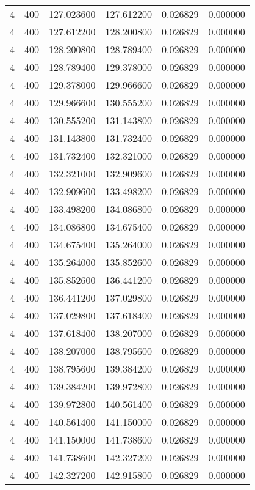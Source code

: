 \begin{longtable}{rrrrrr}
4 & 400 & 127.023600 & 127.612200 & 0.026829 & 0.000000 \\
4 & 400 & 127.612200 & 128.200800 & 0.026829 & 0.000000 \\
4 & 400 & 128.200800 & 128.789400 & 0.026829 & 0.000000 \\
4 & 400 & 128.789400 & 129.378000 & 0.026829 & 0.000000 \\
4 & 400 & 129.378000 & 129.966600 & 0.026829 & 0.000000 \\
4 & 400 & 129.966600 & 130.555200 & 0.026829 & 0.000000 \\
4 & 400 & 130.555200 & 131.143800 & 0.026829 & 0.000000 \\
4 & 400 & 131.143800 & 131.732400 & 0.026829 & 0.000000 \\
4 & 400 & 131.732400 & 132.321000 & 0.026829 & 0.000000 \\
4 & 400 & 132.321000 & 132.909600 & 0.026829 & 0.000000 \\
4 & 400 & 132.909600 & 133.498200 & 0.026829 & 0.000000 \\
4 & 400 & 133.498200 & 134.086800 & 0.026829 & 0.000000 \\
4 & 400 & 134.086800 & 134.675400 & 0.026829 & 0.000000 \\
4 & 400 & 134.675400 & 135.264000 & 0.026829 & 0.000000 \\
4 & 400 & 135.264000 & 135.852600 & 0.026829 & 0.000000 \\
4 & 400 & 135.852600 & 136.441200 & 0.026829 & 0.000000 \\
4 & 400 & 136.441200 & 137.029800 & 0.026829 & 0.000000 \\
4 & 400 & 137.029800 & 137.618400 & 0.026829 & 0.000000 \\
4 & 400 & 137.618400 & 138.207000 & 0.026829 & 0.000000 \\
4 & 400 & 138.207000 & 138.795600 & 0.026829 & 0.000000 \\
4 & 400 & 138.795600 & 139.384200 & 0.026829 & 0.000000 \\
4 & 400 & 139.384200 & 139.972800 & 0.026829 & 0.000000 \\
4 & 400 & 139.972800 & 140.561400 & 0.026829 & 0.000000 \\
4 & 400 & 140.561400 & 141.150000 & 0.026829 & 0.000000 \\
4 & 400 & 141.150000 & 141.738600 & 0.026829 & 0.000000 \\
4 & 400 & 141.738600 & 142.327200 & 0.026829 & 0.000000 \\
4 & 400 & 142.327200 & 142.915800 & 0.026829 & 0.000000 \\

\end{longtable}
